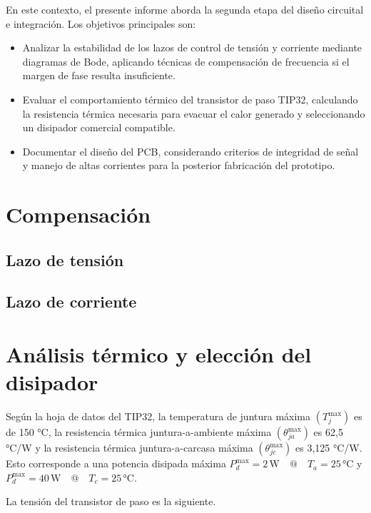 \documentclass[a4paper,12pt]{article}
\begin{document}
En este contexto, el presente informe aborda la segunda etapa del diseño circuital e integración. Los objetivos principales son:
\begin{itemize}
    \item Analizar la estabilidad de los lazos de control de tensión y corriente mediante diagramas de Bode, aplicando técnicas de compensación de frecuencia si el margen de fase resulta insuficiente.
    \item Evaluar el comportamiento térmico del transistor de paso TIP32, calculando la resistencia térmica necesaria para evacuar el calor generado y seleccionando un disipador comercial compatible.
    \item Documentar el diseño del PCB, considerando criterios de integridad de señal y manejo de altas corrientes para la posterior fabricación del prototipo.
\end{itemize}

\section{Compensación}

\subsection{Lazo de tensión}



\subsection{Lazo de corriente}



\section{Análisis térmico y elección del disipador}

Según la hoja de datos del TIP32, la temperatura de juntura máxima $\left(T_j^\text{max}\right)$ es de 150 °C, la resistencia térmica juntura-a-ambiente máxima $\left(\theta_{ja}^\text{max}\right)$ es 62,5 °C/W y la resistencia térmica juntura-a-carcasa máxima $\left(\theta_{jc}^\text{max}\right)$ es 3,125 °C/W. Esto corresponde a una potencia disipada máxima $P_d^\text{max} = 2\,\text{W}\quad@\quad T_{a} = 25\,\text{°C}$ y $P_d^\text{max} = 40\,\text{W}\quad@\quad T_{c} = 25\,\text{°C}$.

La tensión del transistor de paso es la siguiente.
\end{document}
